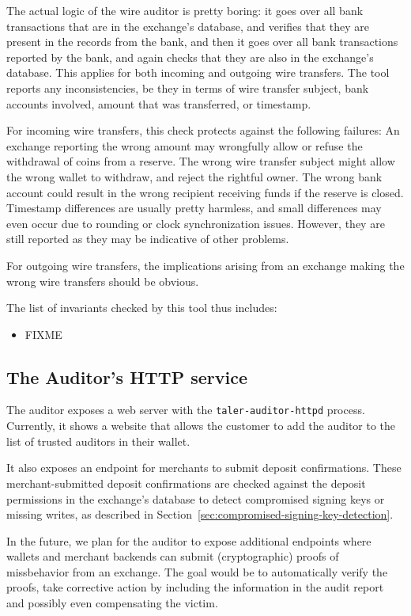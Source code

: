 The actual logic of the wire auditor is pretty boring: it goes over all bank
transactions that are in the exchange's database, and verifies that they are
present in the records from the bank, and then it goes over all bank
transactions reported by the bank, and again checks that they are also in the
exchange's database. This applies for both incoming and outgoing wire
transfers.  The tool reports any inconsistencies, be they in terms of wire
transfer subject, bank accounts involved, amount that was transferred, or
timestamp.

For incoming wire transfers, this check protects against the following
failures: An exchange reporting the wrong amount may wrongfully allow or
refuse the withdrawal of coins from a reserve. The wrong wire transfer subject
might allow the wrong wallet to withdraw, and reject the rightful owner.  The
wrong bank account could result in the wrong recipient receiving funds if the
reserve is closed. Timestamp differences are usually pretty harmless, and
small differences may even occur due to rounding or clock synchronization
issues. However, they are still reported as they may be indicative of other
problems.

For outgoing wire transfers, the implications arising from an exchange making
the wrong wire transfers should be obvious.

The list of invariants checked by this tool thus includes:
\begin{itemize}
  \item FIXME
\end{itemize}


\subsection{The Auditor's HTTP service}

The auditor exposes a web server with the \texttt{taler-auditor-httpd}
process.  Currently, it shows a website that allows the customer to add the
auditor to the list of trusted auditors in their wallet.

It also exposes an endpoint for merchants to submit deposit confirmations.
These merchant-submitted deposit confirmations are checked against the deposit
permissions in the exchange's database to detect compromised signing keys or
missing writes, as described in
Section~\ref{sec:compromised-signing-key-detection}.

In the future, we plan for the auditor to expose additional endpoints where
wallets and merchant backends can submit (cryptographic) proofs of
missbehavior from an exchange. The goal would be to automatically verify the
proofs, take corrective action by including the information in the audit
report and possibly even compensating the victim.


